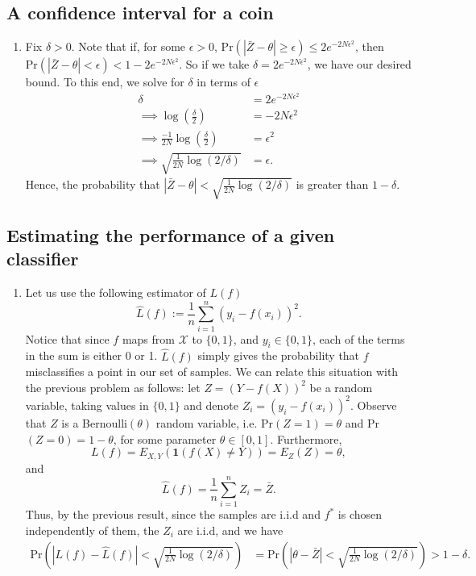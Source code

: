 \documentclass{article}
\begin{document}
\subsection{A confidence interval for a coin}
\begin{enumerate}
	\item Fix $\delta >0$. Note that if, for some $\epsilon>0$, $\mathrm{Pr}(|\bar Z-\theta|\geq\epsilon)\leq 2e^{-2N\epsilon^2}$, then $\mathrm{Pr}(|\bar Z-\theta|<\epsilon)<1-2e^{-2N\epsilon^2}$. So if we take $\delta = 2e^{-2N\epsilon^2}$, we have our desired bound. To this end, we solve for $\delta$ in terms of $\epsilon$
	\begin{align*}
		\delta &= 2e^{-2N\epsilon^2}\\
		\implies \log\left(\frac\delta2\right)&=-2N\epsilon^2\\
		\implies \frac{-1}{2N}\log\left(\frac\delta2\right) &= \epsilon^2\\
		\implies \sqrt{\frac{1}{2N}\log(2/\delta)} &= \epsilon.
	\end{align*}
	Hence, the probability that $|\bar Z-\theta|<\sqrt{\tfrac{1}{2N}\log(2/\delta)}$ is greater than $1-\delta$.
\end{enumerate}

\subsection{Estimating the performance of a given classifier}
\begin{enumerate}
	\item Let us use the following estimator of $L(f)$
	\[
		\hat L(f) := \frac1n\sum^n_{i=1}\left(y_i-f(x_i)\right)^2.
	\]
	Notice that since $f$ maps from $\mathcal{X}$ to $\{0,1\}$, and $y_i\in\{0,1\}$, each of the terms in the sum is either 0 or 1. $\hat L(f)$ simply gives the probability that $f$ misclassifies a point in our set of samples. We can relate this situation with the previous problem as follows: let $Z=(Y-f(X))^2$ be a random variable, taking values in $\{0,1\}$ and denote $Z_i=(y_i-f(x_i))^2$. Observe that $Z$ is a Bernoulli$(\theta)$ random variable, i.e. Pr$(Z=1)=\theta$ and Pr$(Z=0)=1-\theta$, for some parameter $\theta\in[0,1]$. Furthermore,
	\[
		L(f) = E_{X,Y}(\bm{1}(f(X)\neq Y))= E_Z(Z)=\theta,
	\]
	and
	\[
		\hat L(f) = \frac1n\sum^n_{i=1}Z_i = \bar Z.
	\]
	Thus, by the previous result, since the samples are i.i.d and $f^*$ is chosen independently of them, the $Z_i$ are i.i.d, and we have
	\begin{align*}
		\mathrm{Pr}\left(|L(f)-\hat L(f)|<\sqrt{\tfrac{1}{2N}\log(2/\delta)}\right) &= \mathrm{Pr}\left(|\theta-\bar Z|<\sqrt{\tfrac{1}{2N}\log(2/\delta)}\right) > 1- \delta.
	\end{align*}

\end{enumerate}
\end{document}
